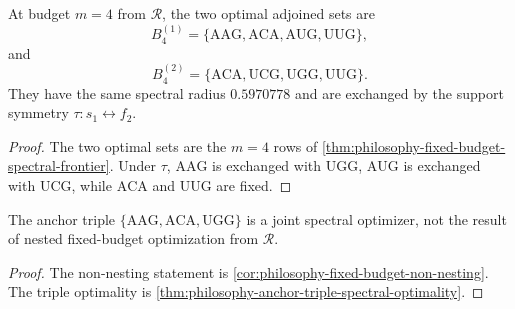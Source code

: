 \begin{theorem}
\label{thm:philosophy-budget-four-spectral-branching}
At budget $m=4$ from $\mathcal{R}$, the two optimal adjoined sets are
$$
  B_4^{(1)}
  =
  \{\mathrm{AAG},\mathrm{ACA},\mathrm{AUG},\mathrm{UUG}\},
$$
and
$$
  B_4^{(2)}
  =
  \{\mathrm{ACA},\mathrm{UCG},\mathrm{UGG},\mathrm{UUG}\}.
$$
They have the same spectral radius $0.5970778$ and are exchanged by
the support symmetry $\tau:s_1\leftrightarrow f_2$.
\end{theorem}
\begin{proof}
The two optimal sets are the $m=4$ rows of
\autoref{thm:philosophy-fixed-budget-spectral-frontier}. Under $\tau$,
$\mathrm{AAG}$ is exchanged with $\mathrm{UGG}$, $\mathrm{AUG}$ is
exchanged with $\mathrm{UCG}$, while $\mathrm{ACA}$ and $\mathrm{UUG}$
are fixed.
\end{proof}

\begin{corollary}
\label{cor:philosophy-anchor-layer-block-stabilizer}
The anchor triple
$\{\mathrm{AAG},\mathrm{ACA},\mathrm{UGG}\}$ is a joint spectral
optimizer, not the result of nested fixed-budget optimization from
$\mathcal{R}$.
\end{corollary}
\begin{proof}
The non-nesting statement is
\autoref{cor:philosophy-fixed-budget-non-nesting}. The triple
optimality is \autoref{thm:philosophy-anchor-triple-spectral-optimality}.
\end{proof}

